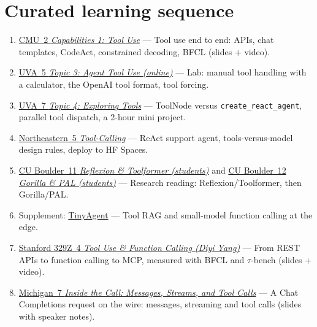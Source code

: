 \documentclass[10pt,oneside]{report}
\begin{document}
\section{Curated learning sequence}
\begin{enumerate}
\item \hyperlink{lec-CMU-2}{CMU~2 \emph{Capabilities 1: Tool Use}} --- Tool use end to end: APIs, chat templates, CodeAct, constrained decoding, BFCL (slides + video).
\item \hyperlink{lec-UVA-5}{UVA~5 \emph{Topic 3: Agent Tool Use (online)}} --- Lab: manual tool handling with a calculator, the OpenAI tool format, tool forcing.
\item \hyperlink{lec-UVA-7}{UVA~7 \emph{Topic 4: Exploring Tools}} --- ToolNode versus \texttt{create\_react\_agent}, parallel tool dispatch, a 2-hour mini project.
\item \hyperlink{lec-NEU-5}{Northeastern~5 \emph{Tool-Calling}} --- ReAct support agent, tools-versus-model design rules, deploy to HF Spaces.
\item \hyperlink{lec-CU-11}{CU Boulder~11 \emph{Reflexion \& Toolformer (students)}} and \hyperlink{lec-CU-12}{CU Boulder~12 \emph{Gorilla \& PAL (students)}} --- Research reading: Reflexion/Toolformer, then Gorilla/PAL.
\item Supplement: \hyperref[sup-tinyagent]{TinyAgent} --- Tool RAG and small-model function calling at the edge.
\item \hyperlink{lec-S329Z-4}{Stanford 329Z~4 \emph{Tool Use \& Function Calling (Diyi Yang)}} --- From REST APIs to function calling to MCP, measured with BFCL and $\tau$-bench (slides + video).
\item \hyperlink{lec-UMICH-7}{Michigan~7 \emph{Inside the Call: Messages, Streams, and Tool Calls}} --- A Chat Completions request on the wire: messages, streaming and tool calls (slides with speaker notes).
\end{enumerate}
\end{document}
